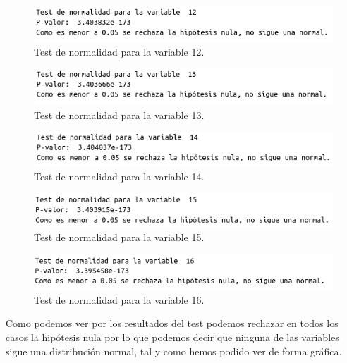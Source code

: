 \documentclass[12pt,a4paper]{article}
\begin{document}
\begin{figure}[H]
	\centering
	\includegraphics[scale=0.65]{./Imagenes/EDA/Regresion/test_normalidad12.png}
	\caption{Test de normalidad para la variable 12.}
\end{figure}

\begin{figure}[H]
	\centering
	\includegraphics[scale=0.65]{./Imagenes/EDA/Regresion/test_normalidad13.png}
	\caption{Test de normalidad para la variable 13.}
\end{figure}

\begin{figure}[H]
	\centering
	\includegraphics[scale=0.65]{./Imagenes/EDA/Regresion/test_normalidad14.png}
	\caption{Test de normalidad para la variable 14.}
\end{figure}

\begin{figure}[H]
	\centering
	\includegraphics[scale=0.65]{./Imagenes/EDA/Regresion/test_normalidad15.png}
	\caption{Test de normalidad para la variable 15.}
\end{figure}

\begin{figure}[H]
	\centering
	\includegraphics[scale=0.65]{./Imagenes/EDA/Regresion/test_normalidad16.png}
	\caption{Test de normalidad para la variable 16.}
\end{figure}

Como podemos ver por los resultados del test podemos rechazar en todos los casos la hipótesis nula por lo que podemos decir que ninguna de las variables sigue una distribución normal, tal y como hemos podido ver de forma gráfica.
\end{document}
